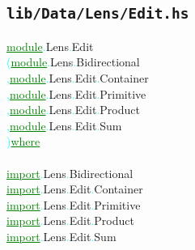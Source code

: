\subsection{\texttt{lib/Data/Lens/Edit.hs}}
\label{mod:Data.Lens.Edit}
\textcolor{green}{\underline{module}}\textcolor{cyan}{.}{\rm{}Lens}\textcolor{cyan}{.}{\rm{}Edit}\\\hstab \textcolor{cyan}{(}\hsspace \textcolor{green}{\underline{module}}\textcolor{cyan}{.}{\rm{}Lens}\textcolor{cyan}{.}{\rm{}Bidirectional}\\\hstab \textcolor{cyan}{,}\hsspace \textcolor{green}{\underline{module}}\textcolor{cyan}{.}{\rm{}Lens}\textcolor{cyan}{.}{\rm{}Edit}\textcolor{cyan}{.}{\rm{}Container}\\\hstab \textcolor{cyan}{,}\hsspace \textcolor{green}{\underline{module}}\textcolor{cyan}{.}{\rm{}Lens}\textcolor{cyan}{.}{\rm{}Edit}\textcolor{cyan}{.}{\rm{}Primitive}\\\hstab \textcolor{cyan}{,}\hsspace \textcolor{green}{\underline{module}}\textcolor{cyan}{.}{\rm{}Lens}\textcolor{cyan}{.}{\rm{}Edit}\textcolor{cyan}{.}{\rm{}Product}\\\hstab \textcolor{cyan}{,}\hsspace \textcolor{green}{\underline{module}}\textcolor{cyan}{.}{\rm{}Lens}\textcolor{cyan}{.}{\rm{}Edit}\textcolor{cyan}{.}{\rm{}Sum}\\\hstab \textcolor{cyan}{)}\hsspace \textcolor{green}{\underline{where}}\\\\\textcolor{green}{\underline{import}}\textcolor{cyan}{.}{\rm{}Lens}\textcolor{cyan}{.}{\rm{}Bidirectional}\\\textcolor{green}{\underline{import}}\textcolor{cyan}{.}{\rm{}Lens}\textcolor{cyan}{.}{\rm{}Edit}\textcolor{cyan}{.}{\rm{}Container}\\\textcolor{green}{\underline{import}}\textcolor{cyan}{.}{\rm{}Lens}\textcolor{cyan}{.}{\rm{}Edit}\textcolor{cyan}{.}{\rm{}Primitive}\\\textcolor{green}{\underline{import}}\textcolor{cyan}{.}{\rm{}Lens}\textcolor{cyan}{.}{\rm{}Edit}\textcolor{cyan}{.}{\rm{}Product}\\\textcolor{green}{\underline{import}}\textcolor{cyan}{.}{\rm{}Lens}\textcolor{cyan}{.}{\rm{}Edit}\textcolor{cyan}{.}{\rm{}Sum}\\

